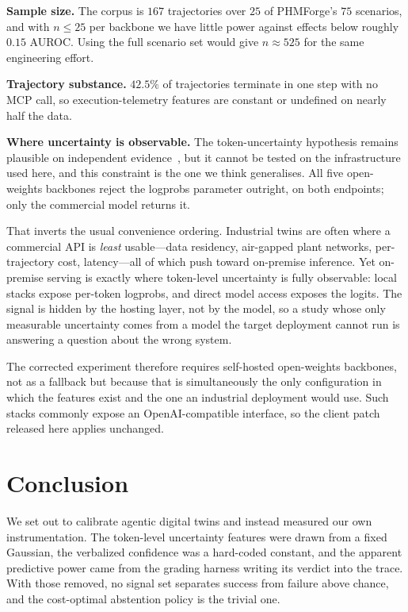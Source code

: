\documentclass[conference]{IEEEtran}
\begin{document}
\textbf{Sample size.} The corpus is $167$ trajectories over $25$ of PHMForge's
$75$ scenarios, and with $n \le 25$ per backbone we have little power against
effects below roughly $0.15$ AUROC. Using the full scenario set would give
$n \approx 525$ for the same engineering effort.

\textbf{Trajectory substance.} $42.5\%$ of trajectories terminate in one step
with no MCP call, so execution-telemetry features are constant or undefined on
nearly half the data.

\textbf{Where uncertainty is observable.} The token-uncertainty hypothesis
remains plausible on independent evidence~\cite{kadavath}, but it cannot be
tested on the infrastructure used here, and this constraint is the one we think
generalises. All five open-weights backbones reject the logprobs parameter
outright, on both endpoints; only the commercial model returns it.

That inverts the usual convenience ordering. Industrial twins are often where a
commercial API is \emph{least} usable---data residency, air-gapped plant
networks, per-trajectory cost, latency---all of which push toward on-premise
inference. Yet on-premise serving is exactly where token-level uncertainty is
fully observable: local stacks expose per-token logprobs, and direct model
access exposes the logits. The signal is hidden by the hosting layer, not by the
model, so a study whose only measurable uncertainty comes from a model the
target deployment cannot run is answering a question about the wrong system.

The corrected experiment therefore requires self-hosted open-weights backbones,
not as a fallback but because that is simultaneously the only configuration in
which the features exist and the one an industrial deployment would use. Such
stacks commonly expose an OpenAI-compatible interface, so the client patch
released here applies unchanged.

\section{Conclusion}

We set out to calibrate agentic digital twins and instead measured our own
instrumentation. The token-level uncertainty features were drawn from a fixed
Gaussian, the verbalized confidence was a hard-coded constant, and the apparent
predictive power came from the grading harness writing its verdict into the
trace. With those removed, no signal set separates success from failure above
chance, and the cost-optimal abstention policy is the trivial one.
\end{document}
